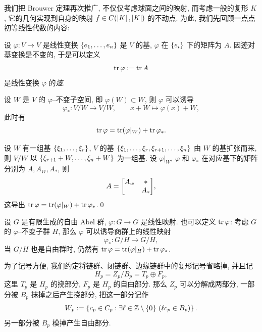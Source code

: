 	我们把 Brouwer 定理再次推广, 不仅仅考虑球面之间的映射, 而考虑一般的复形 $ K $, 它的几何实现到自身的映射 $ f\in C(\left| K \right| ,\left| K \right| ) $ 的不动点. 为此, 我们先回顾一点点初等线性代数的内容:

\begin{Definition}[线性变换的迹]
	设 $ \varphi : V\to V $ 是线性变换 $ \left\{ e_1,\dots,e_n \right\} $ 是 $ V $ 的基, $ \varphi $ 在 $ \left\{ e_i \right\} $ 下的矩阵为 $ A $. 因迹对基变换是不变的, 于是可以定义
	\[
		\tr\varphi:=\tr A
	\]
	是线性变换 $ \varphi $ 的\emph{迹}.
\end{Definition}

\begin{Lemma}\label{lem:分解引理}
	设 $ W $ 是 $ V $ 的 $ \varphi $--不变子空间, 即 $ \varphi(W)\subset W $, 则 $ \varphi $ 可以诱导
	\[
		\varphi_* : V/W\to V/W,\qquad x+W\mapsto \varphi(x)+W,
	\]
	此时有
	\[
		\tr\varphi=\tr(\varphi|_W)+\tr\varphi_*.
	\]
\end{Lemma}
\begin{Proof}
	设 $ W $ 有一组基 $ \left\{ \xi_1,\dots,\xi_r \right\} $, $ V $ 的基 $ \left\{ \xi_1,\dots,\xi_r,\xi_{r+1},\dots,\xi_n \right\} $ 由 $ W $ 的基扩张而来, 则 $ V/W $ 以 $ \left\{ \xi_{r+1}+W,\dots,\xi_n+W \right\} $ 为一组基. 设 $ \varphi|_W $, $ \varphi $ 和 $ \varphi_* $ 在对应基下的矩阵分别为 $ A, A_W, A_* $, 则
	\[
		A=\mqty[A_w & * \\ ~ & A_*],
	\]
	这导出 $ \tr\varphi=\tr(\varphi|_W)+\tr\varphi_* $.\qed
\end{Proof}

设 $ G $ 是有限生成的自由 Abel 群, $ \varphi : G\to G $ 是线性映射. 也可以定义 $ \tr\varphi $: 考虑 $ G $ 的 $ \varphi $--不变子群 $ H $, 那么 $ \varphi $ 可以诱导商群上的线性映射
\[
	\varphi_* : G/H\to G/H,
\]
当 $ G/H $ 也是自由群时, 仍然有 $ \tr\varphi=\tr(\varphi|_H)+\tr\varphi_* $.

为了记号方便, 我们约定将链群、闭链群、边缘链群中的复形记号省略掉, 并且记
\[
	H_p=Z_p/B_p=T_p\oplus F_p,
\]
这里 $ T_p $ 是 $ H_p $ 的挠部分, $ F_p $ 是 $ H_p $ 的自由部分. 那么 $ Z_p $ 可以分解成两部分, 一部分被 $ B_p $ 抹掉之后产生挠部分, 把这一部分记作
\[
	W_p:=\left\{ c_p\in C_p : \exists \ell\in\mathbb{Z}\setminus\left\{ 0 \right\}\,(\ell c_p\in B_p) \right\}.
\]
另一部分被 $ B_p $ 模掉产生自由部分.

